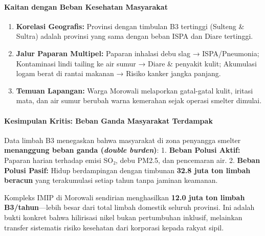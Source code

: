 \documentclass[
]{article}
\providecommand{\tightlist}{%
  \setlength{\itemsep}{0pt}\setlength{\parskip}{0pt}}
\begin{document}
\paragraph{Kaitan dengan Beban Kesehatan
Masyarakat}\label{kaitan-dengan-beban-kesehatan-masyarakat}

\begin{enumerate}
\def\labelenumi{\arabic{enumi}.}
\tightlist
\item
  \textbf{Korelasi Geografis:} Provinsi dengan timbulan B3 tertinggi
  (Sulteng \& Sultra) adalah provinsi yang sama dengan beban ISPA dan
  Diare tertinggi.
\item
  \textbf{Jalur Paparan Multipel:} Paparan inhalasi debu slag →
  ISPA/Pneumonia; Kontaminasi lindi tailing ke air sumur → Diare \&
  penyakit kulit; Akumulasi logam berat di rantai makanan → Risiko
  kanker jangka panjang.
\item
  \textbf{Temuan Lapangan:} Warga Morowali melaporkan gatal-gatal kulit,
  iritasi mata, dan air sumur berubah warna kemerahan sejak operasi
  smelter dimulai.
\end{enumerate}

\paragraph{Kesimpulan Kritis: Beban Ganda Masyarakat
Terdampak}\label{kesimpulan-kritis-beban-ganda-masyarakat-terdampak}

Data limbah B3 menegaskan bahwa masyarakat di zona penyangga smelter
\textbf{menanggung beban ganda (\emph{double burden})}: 1. \textbf{Beban
Polusi Aktif:} Paparan harian terhadap emisi SO₂, debu PM2.5, dan
pencemaran air. 2. \textbf{Beban Polusi Pasif:} Hidup berdampingan
dengan timbunan \textbf{32.8 juta ton limbah beracun} yang terakumulasi
setiap tahun tanpa jaminan keamanan.

Kompleks IMIP di Morowali sendirian menghasilkan \textbf{12.0 juta ton
limbah B3/tahun}---lebih besar dari total limbah domestik seluruh
provinsi. Ini adalah bukti konkret bahwa hilirisasi nikel bukan
pertumbuhan inklusif, melainkan transfer sistematis risiko kesehatan
dari korporasi kepada rakyat sipil.
\end{document}
